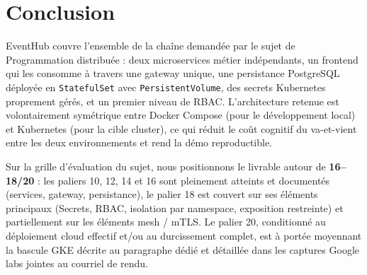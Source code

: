 \documentclass[11pt,a4paper]{article}
\newcommand{\code}[1]{\texttt{#1}}
\begin{document}
\section{Conclusion}

EventHub couvre l'ensemble de la chaîne demandée par le sujet de Programmation distribuée : deux microservices métier indépendants, un frontend qui les consomme à travers une gateway unique, une persistance PostgreSQL déployée en \code{StatefulSet} avec \code{PersistentVolume}, des secrets Kubernetes proprement gérés, et un premier niveau de RBAC. L'architecture retenue est volontairement symétrique entre Docker Compose (pour le développement local) et Kubernetes (pour la cible cluster), ce qui réduit le coût cognitif du va-et-vient entre les deux environnements et rend la démo reproductible.

Sur la grille d'évaluation du sujet, nous positionnons le livrable autour de \textbf{16--18/20} : les paliers 10, 12, 14 et 16 sont pleinement atteints et documentés (services, gateway, persistance), le palier 18 est couvert sur ses éléments principaux (Secrets, RBAC, isolation par namespace, exposition restreinte) et partiellement sur les éléments mesh / mTLS. Le palier 20, conditionné au déploiement cloud effectif et/ou au durcissement complet, est à portée moyennant la bascule GKE décrite au paragraphe dédié et détaillée dans les captures Google labs jointes au courriel de rendu.
\end{document}
